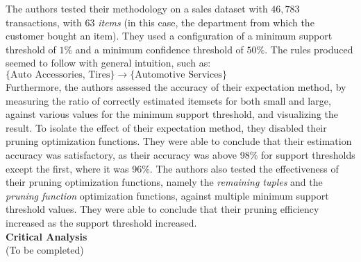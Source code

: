 \documentclass[a4paper,11pt]{article}
\begin{document}
The authors tested their methodology on a sales dataset with $46,783$ transactions,  with $63$ \textit{items} (in this case, the department from which the customer bought an item). They used a configuration of a minimum support threshold of $1\%$ and a minimum confidence threshold of $50\%$. The rules produced seemed to follow with general intuition, such as:\\
$\{\text{Auto Accessories, Tires}\} \rightarrow \{\text{Automotive Services}\} $\\
Furthermore, the authors assessed the accuracy of their expectation method, by measuring the ratio of correctly estimated itemsets for both small and large, against various values for the minimum support threshold, and visualizing the result. To isolate the effect of their expectation method, they disabled their pruning optimization functions. They were able to conclude that their estimation accuracy was satisfactory, as their accuracy was above 98\% for support thresholds except the first, where it was 96\%.  The authors also tested the effectiveness of their pruning optimization functions, namely the \textit{remaining tuples} and the \textit{pruning function} optimization functions, against multiple minimum support threshold values. They were able to conclude that their pruning efficiency increased as the support threshold increased.
\\\textbf{Critical Analysis}\\
(To be completed)
\end{document}
